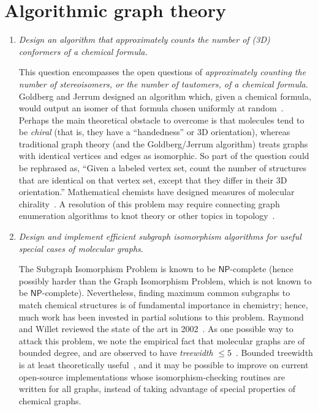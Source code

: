 \documentclass{sig-alternate}
\begin{document}
\section*{Algorithmic graph theory}
\begin{enumerate}
\item \emph{Design an algorithm that approximately counts the number of (3D) conformers of a chemical formula.}

  This question encompasses the open questions of \emph{approximately
    counting the number of stereoisomers, or the number of tautomers,
    of a chemical formula}.  Goldberg and Jerrum designed an algorithm
  which, given a chemical formula, would output an isomer of that
  formula chosen uniformly at random~\cite{RandomlySampling}.  Perhaps
  the main theoretical obstacle to overcome is that molecules tend to
  be \emph{chiral} (that is, they have a ``handedness'' or 3D
  orientation), whereas traditional graph theory (and the
  Goldberg/Jerrum algorithm) treats graphs with identical vertices and
  edges as isomorphic.  So part of the question could be rephrased as,
  ``Given a labeled vertex set, count the number of structures that
  are identical on that vertex set, except that they differ in their
  3D orientation.''  Mathematical chemists have designed measures of
  molecular chirality~\cite{ChiralityMeasures}. A resolution of this
  problem may require connecting graph enumeration algorithms to knot
  theory or other topics in topology~\cite{TopologicalLook}.
%
\item \emph{Design and implement efficient subgraph isomorphism
    algorithms for useful special cases of molecular graphs}.

  The Subgraph Isomorphism Problem is known to be
  $\textsf{NP}$-complete (hence possibly harder than the Graph
  Isomorphism Problem, which is not known to be
  $\textsf{NP}$-complete).  Nevertheless, finding maximum common
  subgraphs to match chemical structures is of fundamental importance
  in chemistry; hence, much work has been invested in partial
  solutions to this problem.  Raymond and Willet reviewed the state of
  the art in 2002~\cite{MCSreview}.  As one possible way to attack
  this problem, we note the empirical fact that molecular graphs are
  of bounded degree, and are observed to have \emph{treewidth} $\leq
  5$~\cite{treewidth}.  Bounded treewidth is at least theoretically
  useful~\cite{Epp-JGAA-99}, and it may be possible to improve on
  current open-source implementations whose isomorphism-checking
  routines are written for all graphs, instead of taking advantage of
  special properties of chemical graphs.


\end{enumerate}
\end{document}
